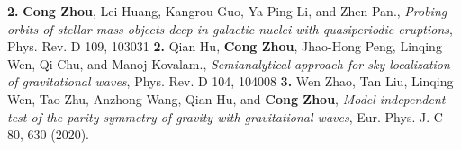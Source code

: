 
\begin{cventries}
\vspace{-0.45cm}
  \cventry
    {}
    {}
    {}
    {}
    {\textbf{2.} \textnormal{\textbf{Cong Zhou}, Lei Huang, Kangrou Guo, Ya-Ping Li, and Zhen Pan., \textsl{Probing orbits of stellar mass objects deep in galactic nuclei with quasiperiodic eruptions}, Phys. Rev. D 109, 103031}}
  \vspace{-0.2cm}
  \cventry
    {}
    {}
    {}
    {}
    {\textbf{2.} \textnormal{Qian Hu, \textbf{Cong Zhou}, Jhao-Hong Peng, Linqing Wen, Qi Chu, and Manoj Kovalam., \textsl{Semianalytical approach for sky localization of gravitational waves}, Phys. Rev. D 104, 104008}}
  \vspace{-0.2cm}
  \cventry
  {}
  {}
  {}
  {}
  {\textbf{3.} \textnormal{Wen Zhao, Tan Liu, Linqing Wen, Tao Zhu, Anzhong Wang, Qian Hu, and \textbf{Cong Zhou},  \textsl{Model-independent test of the parity symmetry of gravity with gravitational waves}, Eur. Phys. J. C 80, 630 (2020).}}
\vspace{-0.35cm}
\end{cventries}